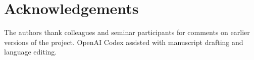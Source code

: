 \section*{Acknowledgements}
The authors thank colleagues and seminar participants for comments on earlier versions of the project.
OpenAI Codex assisted with manuscript drafting and language editing.

